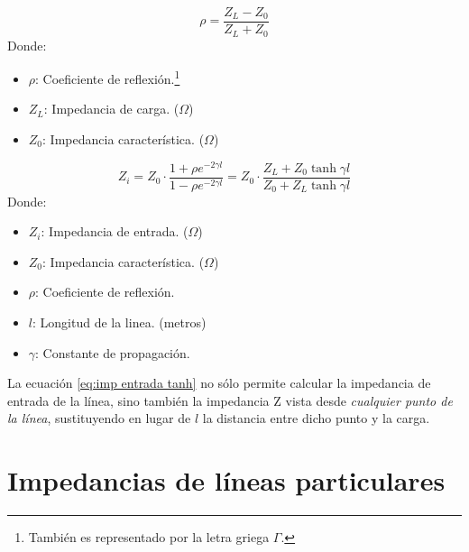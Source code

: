\documentclass[
	12pt, %
	fleqn, %
	a4paper, %
	oneside, %
]{LegrandOrangeBook}
\begin{document}
\begin{definition}
\begin{equation}
\rho=\frac{Z_L-Z_0}{Z_L+Z_0}
\label{eq:coef reflex}
\end{equation}
Donde:
\begin{itemize}
\item $\rho$: Coeficiente de reflexión.\footnote{También es representado por la letra griega $\Gamma$.}
\item $Z_L$: Impedancia de carga. ($\Omega$)
\item $Z_0$: Impedancia característica. ($\Omega$)
\end{itemize}
\end{definition}
\begin{definition}
\begin{equation}
Z_i=Z_0\cdot\frac{1+\rho e^{-2\gamma l}}{1-\rho e^{-2\gamma l}}=Z_0\cdot\frac{Z_L+Z_0\tanh\gamma l}{Z_0+Z_L\tanh\gamma l}
\label{eq:imp entrada tanh}
\end{equation}
Donde:
\begin{itemize}
\item $Z_i$: Impedancia de entrada. ($\Omega$)
\item $Z_0$: Impedancia característica. ($\Omega$)
\item $\rho$: Coeficiente de reflexión.
\item $l$: Longitud de la linea. (metros)
\item $\gamma$: Constante de propagación. 
\end{itemize}
La ecuación \ref{eq:imp entrada tanh} no sólo permite calcular la impedancia de entrada de la línea, sino también la impedancia Z vista desde \emph{cualquier punto de la línea}, sustituyendo en lugar de $l$ la distancia entre dicho punto y la carga.
\end{definition}
\section{Impedancias de líneas particulares}
\end{document}
